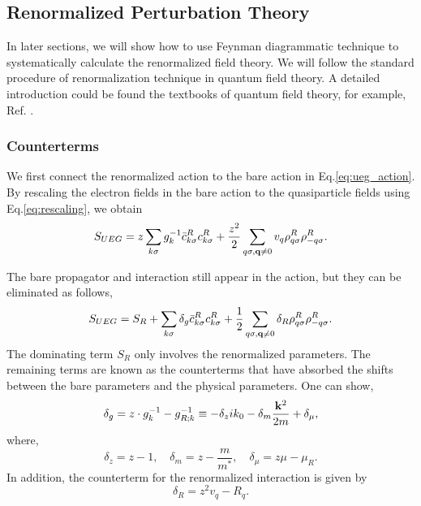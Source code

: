 \documentclass[reprint,amsmath,amssymb,aps,prb]{revtex4-1}
\begin{document}
\subsection{Renormalized Perturbation Theory}

In later sections, we will show how to use Feynman diagrammatic technique to systematically calculate the renormalized field theory. We will follow the standard procedure of renormalization technique in quantum field theory. A detailed introduction could be found the textbooks of quantum field theory, for example, Ref. .


\subsubsection{Counterterms}

We first connect the renormalized action to the bare action in Eq.\eqref{eq:ueg_action}. By rescaling the electron fields in the bare action to the quasiparticle fields using Eq.\eqref{eq:rescaling}, we obtain
\begin{equation}
    S_{UEG} = z\sum_{k \sigma} g_{k}^{-1}\bar{c}^R_{k \sigma} c^R_{k \sigma} + \frac{z^2}{2}\sum_{q\sigma, \mathbf{q} \neq 0}  v_q \rho^R_{q\sigma} \rho^R_{-q\sigma}.
\end{equation}

The bare propagator and interaction still appear in the action, but they can be eliminated as follows,
\begin{equation}
    \label{eq:renorm_action}
    S_{UEG} = S_R + \sum_{k \sigma} \delta_g \bar{c}^R_{k \sigma} c^R_{k \sigma} + \frac{1}{2}\sum_{q\sigma, \mathbf{q} \neq 0}  \delta_R \rho^R_{q\sigma} \rho^R_{-q\sigma}.
\end{equation}
The dominating term $S_R$ only involves the renormalized parameters. The remaining terms are known as the counterterms that have absorbed the shifts between the bare parameters and the physical parameters. One can show,
\begin{equation}
    \label{eq:ct1}
    \delta_g=z\cdot g_k^{-1}-g_{R; k}^{-1} \equiv -\delta_z ik_0-\delta_m \frac{\mathbf{k}^2}{2m} +\delta_\mu,
\end{equation}
where,
\begin{equation}
    \label{eq:ct2}
    \delta_z=z-1, \quad \delta_m=z-\frac{m}{m^*},\quad  \delta_\mu=z\mu-\mu_R.
\end{equation}
In addition, the counterterm for the renormalized interaction is given by
\begin{equation}
    \label{eq:ct3}
    \delta_R = z^2 v_q - R_q.
\end{equation}
\end{document}
